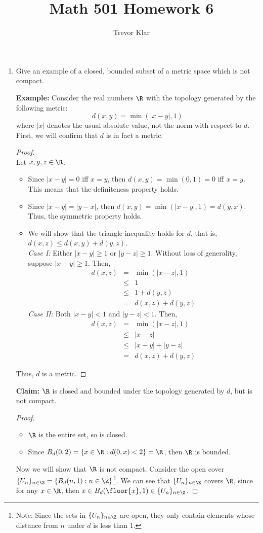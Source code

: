 \documentclass[letterpaper]{article}
\title{Math 501 \linebreak
Homework 6}
\author{Trevor Klar}
\begin{document}
\maketitle

\begin{enumerate}
\item Give an example of a closed, bounded subset of a metric space which is not compact.

\textbf{Example: }Consider the real numbers $\R$ with the topology generated by the following metric:
$$d(x,y)= \min\left(|x-y|, 1\right)$$
where $|x|$ denotes the usual absolute value, not the norm with respect to $d$. First, we will confirm that $d$ is in fact a metric.
\begin{proof}\mbox{}\\
Let $x,y,z\in \R$. 
\begin{itemize}
\item Since $|x-y|=0$ iff $x = y$, then $d(x,y)=\min(0,1)=0$ iff $x=y$. This means that the definiteness property holds. 
\item Since $|x-y|=|y-x|$, then $d(x,y)=\min(|x-y|,1)=d(y,x)$. Thus, the symmetric property holds. 
\item We will show that the triangle inequality holds for $d$, that is, $d(x,z)\leq d(x,y)+d(y,z)$.\\
\textit{Case I:} Either $|x-y|\geq1$ or $|y-z|\geq1$. Without loss of generality, suppose $|x-y|\geq1$. Then, 
\[
\begin{array}{rcl}
d(x,z)	&=&	\min(|x-z|,1)\\
		&\leq& 1 \\
		&\leq& 1+d(y,z) \\
		&=&	d(x,z)+d(y,z)
\end{array}
\]
\textit{Case II:} Both $|x-y|<1$ and $|y-z|<1$. Then, 
\[
\begin{array}{rcl}
d(x,z)	&=&	\min(|x-z|,1)\\
		&\leq& |x-z| \\
		&\leq& |x-y| + |y-z| \\
		&=&	d(x,z)+d(y,z)
\end{array}
\]
\end{itemize}
Thus, $d$ is a metric. 
\end{proof}
\textbf{Claim:} $\R$ is closed and bounded under the topology generated by $d$, but is not compact. 
\begin{proof}\mbox{}
\begin{itemize}
\item $\R$ is the entire set, so is closed.
\item Since $B_d(0,2)	= \{x\in\R : d(0,x) < 2\} = \R$,  then $\R$ is bounded. 
\end{itemize}
Now we will show that $\R$ is not compact. Consider the open cover $\{U_n\}_{n\in\Z}=\{B_d(n,1):n\in\Z\}$\footnote{Note: Since the sets in $\{U_n\}_{n\in\Z}$ are open, they only contain elements whose distance from $n$ under $d$ is less than 1.}. We can see that $\{U_n\}_{n\in\Z}$ covers $\R$, since for any $x\in\R$, then $x\in B_d(\floor{x},1)\in\{U_n\}_{n\in\Z}$.


\end{proof}
\end{enumerate}
\end{document}
